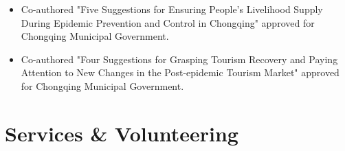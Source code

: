 \documentclass[a4paper,20pt]{article}
\begin{document}
    \begin{itemize}
        \item Co-authored "Five Suggestions for Ensuring People's Livelihood Supply During Epidemic Prevention and Control in Chongqing" approved for Chongqing Municipal Government.  \vspace{-5pt}
        \item Co-authored "Four Suggestions for Grasping Tourism Recovery and Paying Attention to New Changes in the Post-epidemic Tourism Market" approved for Chongqing Municipal Government.
    \end{itemize}



% 	



\section{Services \& Volunteering}
\end{document}
